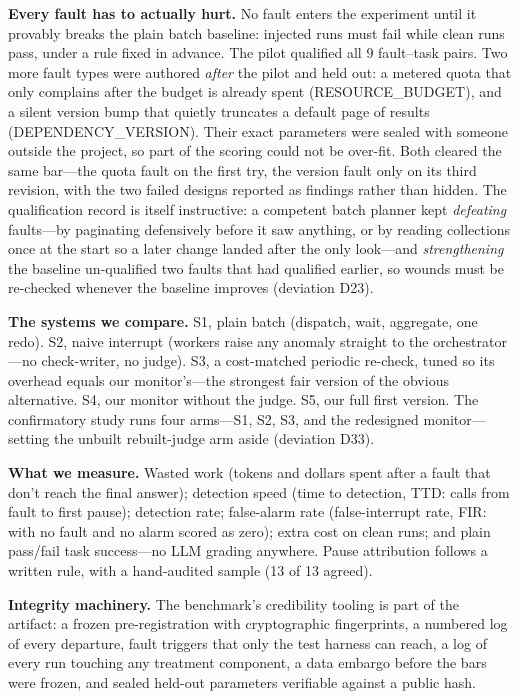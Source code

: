 \documentclass[acmsmall,screen]{acmart}
\begin{document}
\textbf{Every fault has to actually hurt.} No fault enters the experiment until
it provably breaks the plain batch baseline: injected runs must fail while clean
runs pass, under a rule fixed in advance. The pilot qualified all 9 fault--task
pairs. Two more fault types were authored \emph{after} the pilot and held out: a
metered quota that only complains after the budget is already spent
(RESOURCE\_BUDGET), and a silent version bump that quietly truncates a default
page of results (DEPENDENCY\_VERSION). Their exact parameters were sealed with
someone outside the project, so part of the scoring could not be over-fit. Both
cleared the same bar---the quota fault on the first try, the version fault only
on its third revision, with the two failed designs reported as findings rather
than hidden. The qualification record is itself instructive: a competent batch
planner kept \emph{defeating} faults---by paginating defensively before it saw
anything, or by reading collections once at the start so a later change landed
after the only look---and \emph{strengthening} the baseline un-qualified two
faults that had qualified earlier, so wounds must be re-checked whenever the
baseline improves (deviation D23).

\textbf{The systems we compare.} S1, plain batch (dispatch, wait, aggregate,
one redo). S2, naive interrupt (workers raise any anomaly straight to the
orchestrator---no check-writer, no judge). S3, a cost-matched periodic
re-check, tuned so its overhead equals our monitor's---the strongest fair
version of the obvious alternative. S4, our monitor without the judge. S5, our
full first version. The confirmatory study runs four arms---S1, S2, S3, and the
redesigned monitor---setting the unbuilt rebuilt-judge arm aside (deviation
D33).

\textbf{What we measure.} Wasted work (tokens and dollars spent after a fault
that don't reach the final answer); detection speed (time to detection, TTD:
calls from fault to first pause); detection rate; false-alarm rate (false-interrupt
rate, FIR: with no fault and no alarm scored as zero); extra cost on clean runs;
and plain pass/fail task success---no LLM grading anywhere. Pause attribution follows a written rule, with a hand-audited
sample (13 of 13 agreed).

\textbf{Integrity machinery.} The benchmark's credibility tooling is part of
the artifact: a frozen pre-registration with cryptographic fingerprints, a
numbered log of every departure, fault triggers that only the test harness can
reach, a log of every run touching any treatment component, a data embargo
before the bars were frozen, and sealed held-out parameters verifiable against a
public hash.
\end{document}
